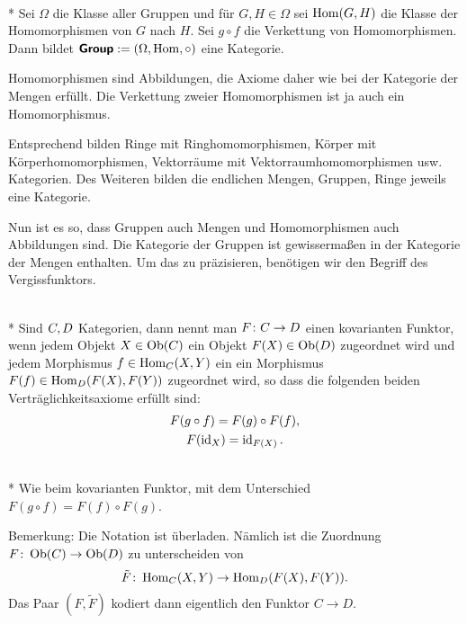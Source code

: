 \begin{Satz}\mbox{}\\*
Sei $\Omega$ die Klasse aller Gruppen und für $G,H\in\Omega$ sei
$\operatorname{Hom}(G,H)$ die Klasse der Homomorphismen von $G$ nach $H$.
Sei $g\circ f$ die Verkettung von Homomorphismen.
Dann bildet $\textsf{\textbf{Group}}:=(\Omega,\operatorname{Hom},\circ)$
eine Kategorie.
\end{Satz}
 Homomorphismen sind Abbildungen, die Axiome
daher wie bei der Kategorie der Mengen erfüllt. Die Verkettung
zweier Homomorphismen ist ja auch ein Homomorphismus.\;\qedsymbol

Entsprechend bilden Ringe mit Ringhomomorphismen, Körper mit
Körperhomomorphismen, Vektorräume mit Vektorraumhomomorphismen
usw. Kategorien. Des Weiteren bilden die endlichen Mengen, Gruppen,
Ringe jeweils eine Kategorie.

Nun ist es so, dass Gruppen auch Mengen und Homomorphismen
auch Abbildungen sind. Die Kategorie der Gruppen ist gewissermaßen
in der Kategorie der Mengen enthalten. Um das zu präzisieren,
benötigen wir den Begriff des Vergissfunktors.

\begin{Definition}\mbox{}\\*
Sind $C,D$ Kategorien, dann nennt man
$F\colon C\to D$ einen
kovarianten Funktor, wenn jedem Objekt $X\in\operatorname{Ob}(C)$ ein Objekt
$F(X)\in\operatorname{Ob}(D)$ zugeordnet wird und jedem Morphismus
$f\in\operatorname{Hom}_{C}(X,Y)$ ein ein Morphismus
$F(f)\in\operatorname{Hom}_{D}(F(X),F(Y))$ zugeordnet wird,
so dass die folgenden beiden Verträglichkeitsaxiome erfüllt sind:%
\begin{gather*}
F(g\circ f) = F(g)\circ F(f),\\
F(\operatorname{id}_X) = \operatorname{id}_{F(X)}.
\end{gather*}
\end{Definition}
\begin{Definition}\mbox{}\\*
Wie beim kovarianten Funktor, mit dem Unterschied
$F(g\circ f) = F(f)\circ F(g)$.
\end{Definition}
Bemerkung: Die Notation ist überladen. Nämlich ist die Zuordnung
$F\colon\operatorname{Ob}(C)\to\operatorname{Ob}(D)$ zu unterscheiden
von
\[\tilde F\colon\operatorname{Hom}_{C}(X,Y)\to\operatorname{Hom}_{D}(F(X),F(Y)).\]
Das Paar $(F,\tilde F)$ kodiert dann eigentlich den Funktor
$C\to D$.


